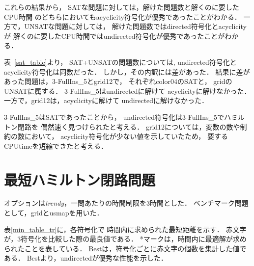 これらの結果から，
\textsf{SAT}な問題に対しては，解けた問題数と解くのに要したCPU時間
のどちらにおいても\textsf{acyclicity}符号化が優秀であったことがわかる．
一方で，\textsf{UNSAT}な問題に対しては，
解けた問題数では\textsf{directed}符号化と\textsf{acyclicity}が
解くのに要したCPU時間では\textsf{undirected}符号化が優秀であったことがわかる．

表~\ref{sat_table}より，
\textsf{SAT+UNSAT}の問題数については,
\textsf{undirected}符号化と\textsf{acyclicity}符号化は同数だった．
しかし，その内訳には差があった．
結果に差があった問題は，\textsf{3-FullIns\_5}と\textsf{grid12}で，
それぞれ\textsf{color04}の\textsf{SAT}と，
\textsf{grid}の\textsf{UNSAT}に属する．
\textsf{3-FullIns\_5}は\textsf{undirected}に解けて
\textsf{acyclicity}に解けなかった．
一方で，\textsf{grid12}は，\textsf{acyclicity}に解けて
\textsf{undirected}に解けなかった．

\textsf{3-FullIns\_5}は\textsf{SAT}であったことから，
\textsf{undirected}符号化は\textsf{3-FullIns\_5}でハミルトン閉路を
偶然速く見つけられたと考える．
\textsf{grid12}については，変数の数や制約の数において，
\textsf{acyclicity}符号化が少ない値を示していたため，
要するCPUtimeを短縮できたと考える．


\section{最短ハミルトン閉路問題}


オプションは\textit{trendy}，一問あたりの時間制限を3時間とした．
ベンチマーク問題として，\textsf{grid}と\textsf{usmap}を用いた．

表\ref{min_table_tr}に，各符号化で
時間内に求められた最短距離を示す．
赤文字が，3符号化を比較した際の最良値である．
*マークは，時間内に最適解が求められたことを表している．
Bestは，符号化ごとに赤文字の個数を集計した値である．
Bestより，\textsf{undirected}が優秀な性能を示した．

